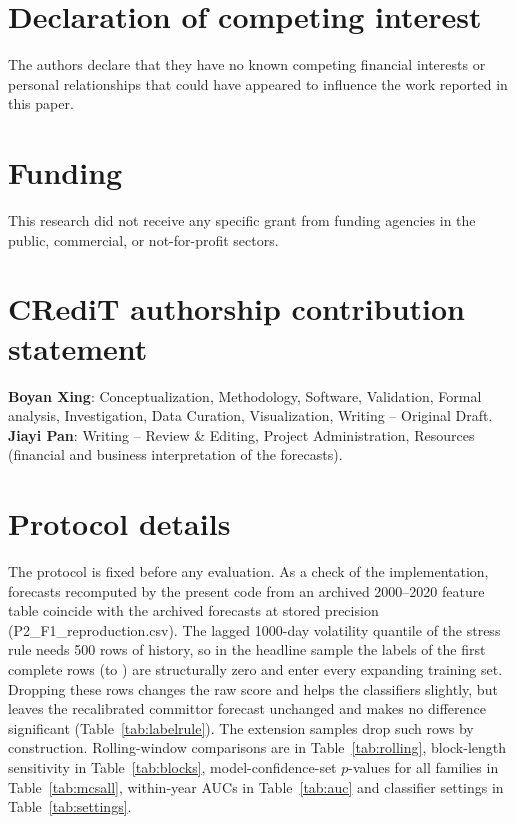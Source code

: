 \documentclass[preprint,12pt,authoryear]{elsarticle}
\begin{document}
\section*{Declaration of competing interest}
The authors declare that they have no known competing financial interests or personal relationships that could have appeared to influence the work reported in this paper.

\section*{Funding}
This research did not receive any specific grant from funding agencies in the public, commercial, or not-for-profit sectors.

\section*{CRediT authorship contribution statement}
\textbf{Boyan Xing}: Conceptualization, Methodology, Software, Validation, Formal analysis, Investigation, Data Curation, Visualization, Writing -- Original Draft. \textbf{Jiayi Pan}: Writing -- Review \& Editing, Project Administration, Resources (financial and business interpretation of the forecasts).

\appendix
\section{Protocol details}\label{app:protocol}
The protocol is fixed before any evaluation. As a check of the implementation, forecasts recomputed by the present code from an archived 2000--2020 feature table coincide with the archived forecasts at stored precision (P2\_F1\_reproduction.csv). The lagged 1000-day volatility quantile of the stress rule needs 500 rows of history, so in the headline sample the labels of the first \LabelRows complete rows (\LabelFromDate to \LabelToDate) are structurally zero and enter every expanding training set. Dropping these rows changes the raw score and helps the classifiers slightly, but leaves the recalibrated committor forecast unchanged and makes no difference significant (Table~\ref{tab:labelrule}). The extension samples drop such rows by construction. Rolling-window comparisons are in Table~\ref{tab:rolling}, block-length sensitivity in Table~\ref{tab:blocks}, model-confidence-set $p$-values for all families in Table~\ref{tab:mcsall}, within-year AUCs in Table~\ref{tab:auc} and classifier settings in Table~\ref{tab:settings}.
\end{document}
